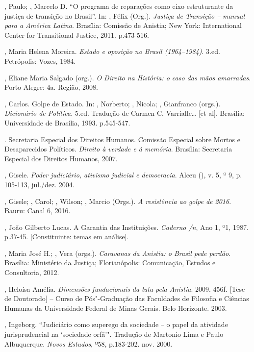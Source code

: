\begin{Parskip}
, Paulo; , Marcelo D. ``O programa de reparações como eixo
estruturante da justiça de transição no Brasil''. In: , Félix
(Org.). \emph{Justiça de Transição -- manual para a América Latina}.
Brasília: Comissão de Anistia; New York: International Center for
Transitional Justice, 2011. p.473-516.

, Maria Helena Moreira. \emph{Estado e oposição no Brasil
(1964--1984)}. 3.ed. Petrópolis: Vozes, 1984.

, Eliane Maria Salgado (org.). \emph{O Direito na História:
o caso das mãos amarradas}. Porto Alegre:  4a. Região, 2008.

, Carlos. Golpe de Estado. In: ,
Norberto; , Nicola;
, Gianfranco (orgs.). \emph{Dicionário de Política.} 5.ed.
Tradução de Carmen C. Varrialle\ldots{} {[}et al{]}. Brasília: Universidade
de Brasília, 1993. p.545-547.

. Secretaria Especial dos Direitos Humanos. Comissão Especial
sobre Mortos e Desaparecidos Políticos. \emph{Direito à verdade e à
memória}. Brasília: Secretaria Especial dos Direitos Humanos, 2007.

, Gisele. \emph{Poder judiciário, ativismo judicial e
democracia}. Alceu (), v. 5, º 9, p. 105-113, jul./dez. 2004.

, Gisele; , Carol;  , Wilson; , Marcio
(Orgs.). \emph{A resistência ao golpe de 2016}. Bauru: Canal 6, 2016.

, João Gilberto Lucas. A Garantia das Instituições.
\emph{Caderno /n}, Ano 1, º1,
1987. p.37-45. {[}Constituinte: temas em análise{]}.

, Maria José H.; , Vera (orgs.). \emph{Caravanas da
Anistia: o Brasil pede perdão}. Brasília: Ministério da Justiça;
Florianópolis: Comunicação, Estudos e Consultoria, 2012.

, Heloísa Amélia. \emph{Dimensões fundacionais da luta pela
Anistia}. 2009. 456f. {[}Tese de Doutorado{]} -- Curso de Pós"-Graduação
das Faculdades de Filosofia e Ciências Humanas da Universidade Federal
de Minas Gerais. Belo Horizonte. 2003.

, Ingeborg. ``Judiciário como superego da sociedade -- o papel da
atividade jurisprudencial na `sociedade orfã'". Tradução de Martonio Lima
e Paulo Albuquerque. \emph{Novos Estudos}, º58, p.183-202. nov. 2000.


\end{Parskip}
